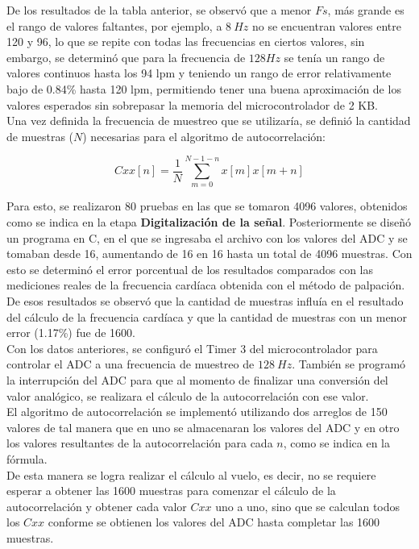 De los resultados de la tabla anterior, se observó que a menor $Fs$, más grande es el rango de valores faltantes, por ejemplo, a $8\ Hz$ no se encuentran valores entre 120 y 96, lo que se repite con todas las frecuencias en ciertos valores, sin embargo, se determinó que para la frecuencia de $128 Hz$ se tenía un rango de valores continuos hasta los 94 lpm y teniendo un rango de error relativamente bajo de 0.84\% hasta 120 lpm, permitiendo tener una buena aproximación de los valores esperados sin sobrepasar la memoria del microcontrolador de 2 KB. \\

Una vez definida la frecuencia de muestreo que se utilizaría, se definió la cantidad de muestras ($N$) necesarias para el algoritmo de autocorrelación:

$$Cxx[n] = \frac{1}{N} \sum_{m=0}^{N-1-n}x[m]x[m+n]$$

Para esto, se realizaron 80 pruebas en las que se tomaron 4096 valores, obtenidos como se indica en la etapa \textbf{Digitalización de la señal}. Posteriormente se diseñó un programa en C, en el que se ingresaba el archivo con los valores del ADC y se tomaban desde 16, aumentando de 16 en 16 hasta un total de 4096 muestras. Con esto se determinó el error porcentual de los resultados comparados con las mediciones reales de la frecuencia cardíaca obtenida con el método de palpación. \\

De esos resultados se observó que la cantidad de muestras influía en el resultado del cálculo de la frecuencia cardíaca y que la cantidad de muestras con un menor error (1.17\%) fue de 1600. \\

Con los datos anteriores, se configuró el Timer 3 del microcontrolador para controlar el ADC a una frecuencia de muestreo de $128\ Hz$. También se programó la interrupción del ADC para que al momento de finalizar una conversión del valor analógico, se realizara el cálculo de la autocorrelación con ese valor. \\

El algoritmo de autocorrelación se implementó utilizando dos arreglos de 150 valores de tal manera que en uno se almacenaran los valores del ADC y en otro los valores resultantes de la autocorrelación para cada $n$, como se indica en la fórmula.\\ 

De esta manera se logra realizar el cálculo al vuelo, es decir, no se requiere esperar a obtener las 1600 muestras para comenzar el cálculo de la autocorrelación y obtener cada valor $Cxx$ uno a uno, sino que se calculan todos los $Cxx$ conforme se obtienen los valores del ADC hasta completar las 1600 muestras. \\

